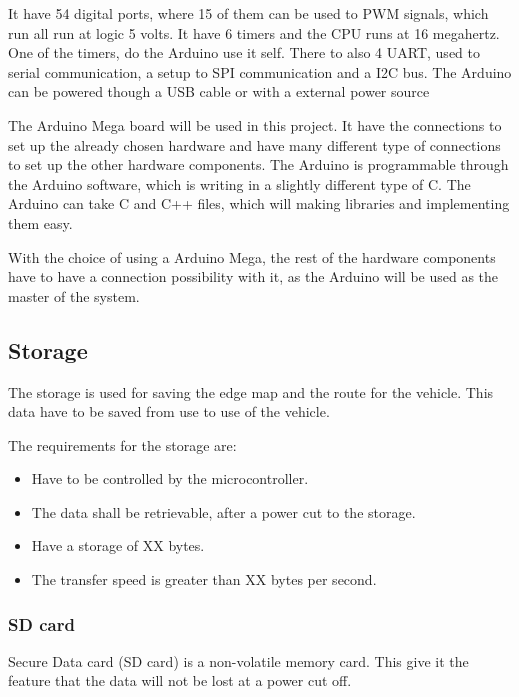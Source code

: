 It have 54 digital ports, where 15 of them can be used to PWM signals, which run all run at logic 5 volts. It have 6 timers and the CPU runs at 16 megahertz. One of the timers, do the Arduino use it self. There to also 4 UART, used to serial communication, a setup to SPI communication and a I2C bus. The Arduino can be powered though a USB cable or with a external power source

The Arduino Mega board will be used in this project. It have the connections to set up the already chosen hardware and have many different type of connections to set up the other hardware components. The Arduino is programmable through the Arduino software, which is writing in a slightly different type of C. The Arduino can take C and C++ files, which will making libraries and implementing them easy. 


With the choice of using a Arduino Mega, the rest of the hardware components have to have a connection possibility with it, as the Arduino will be used as the master of the system. 



\subsection{Storage}
The storage is used for saving the edge map and the route for the vehicle. This data have to be saved from use to use of the vehicle. 

The requirements for the storage are:
\begin{itemize}
\item Have to be controlled by the microcontroller.
\item The data shall be retrievable, after a power cut to the storage.
\item Have a storage of XX bytes. 
\item The transfer speed is greater than XX bytes per second. 
\end{itemize}

\subsubsection{SD card} \label{SDcard}
Secure Data card (SD card) is a non-volatile memory card. This give it the feature that the data will not be lost at a power cut off. 

